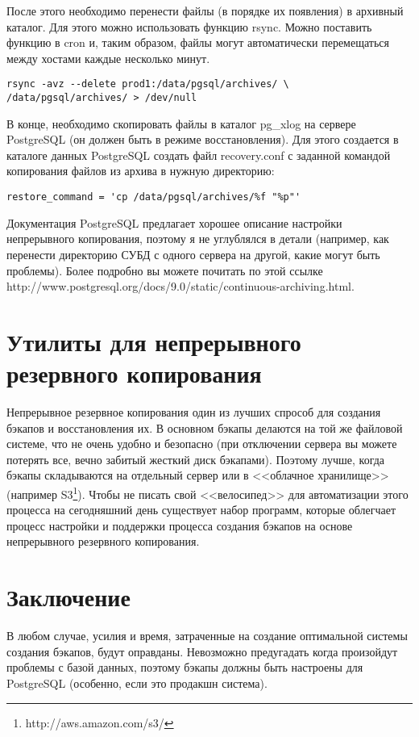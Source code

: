 После этого необходимо перенести файлы (в порядке их появления) в архивный каталог. 
Для этого можно использовать функцию rsync.
Можно поставить функцию в cron и, таким образом, файлы могут автоматически перемещаться между 
хостами каждые несколько минут.
\begin{lstlisting}[label=lst:backups16,caption=Копирование WAL файлов на другой хост]
rsync -avz --delete prod1:/data/pgsql/archives/ \
/data/pgsql/archives/ > /dev/null
\end{lstlisting}

В конце, необходимо скопировать файлы в каталог pg\_xlog на сервере PostgreSQL (он должен быть в режиме восстановления). 
Для этого создается в каталоге данных PostgreSQL создать файл recovery.conf с заданной командой копирования 
файлов из архива в нужную директорию:
\begin{lstlisting}[label=lst:backups17,caption=recovery.conf]
restore_command = 'cp /data/pgsql/archives/%f "%p"'
\end{lstlisting}

Документация PostgreSQL предлагает хорошее описание настройки непрерывного копирования, поэтому я не углублялся в детали 
(например, как перенести директорию СУБД с одного сервера на другой, какие могут быть проблемы). Более подробно вы 
можете почитать по этой ссылке http://www.postgresql.org/docs/9.0/static/continuous-archiving.html.

\section{Утилиты для непрерывного резервного копирования}
Непрерывное резервное копирования один из лучших спрособ для создания бэкапов и восстановления их. В основном бэкапы делаются на той же файловой системе, что не очень удобно и безопасно (при отключении сервера вы можете потерять все, вечно забитый жесткий диск бэкапами). Поэтому лучше, когда бэкапы складываются на отдельный сервер или в <<облачное хранилище>> (например S3\footnote{http://aws.amazon.com/s3/}). Чтобы не писать свой <<велосипед>> для автоматизации этого процесса на сегодняшний день существует набор программ, которые облегчает процесс настройки и поддержки процесса создания бэкапов на основе непрерывного резервного копирования.




\section{Заключение}
В любом случае, усилия и время, затраченные на создание оптимальной системы создания бэкапов, будут оправданы. 
Невозможно предугадать когда произойдут проблемы с базой данных, поэтому бэкапы должны быть настроены для PostgreSQL 
(особенно, если это продакшн система).